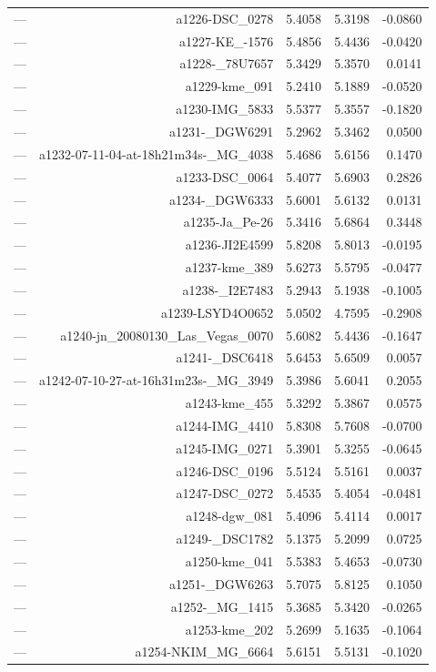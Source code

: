 \begin{table}[htbp]
\begin{tabular}{lrrrr}
— & a1226-DSC_0278 & 5.4058 & 5.3198 & -0.0860 \\
— & a1227-KE_-1576 & 5.4856 & 5.4436 & -0.0420 \\
— & a1228-_78U7657 & 5.3429 & 5.3570 & 0.0141 \\
— & a1229-kme_091 & 5.2410 & 5.1889 & -0.0520 \\
— & a1230-IMG_5833 & 5.5377 & 5.3557 & -0.1820 \\
— & a1231-_DGW6291 & 5.2962 & 5.3462 & 0.0500 \\
— & a1232-07-11-04-at-18h21m34s-_MG_4038 & 5.4686 & 5.6156 & 0.1470 \\
— & a1233-DSC_0064 & 5.4077 & 5.6903 & 0.2826 \\
— & a1234-_DGW6333 & 5.6001 & 5.6132 & 0.0131 \\
— & a1235-Ja_Pe-26 & 5.3416 & 5.6864 & 0.3448 \\
— & a1236-JI2E4599 & 5.8208 & 5.8013 & -0.0195 \\
— & a1237-kme_389 & 5.6273 & 5.5795 & -0.0477 \\
— & a1238-_I2E7483 & 5.2943 & 5.1938 & -0.1005 \\
— & a1239-LSYD4O0652 & 5.0502 & 4.7595 & -0.2908 \\
— & a1240-jn_20080130_Las_Vegas_0070 & 5.6082 & 5.4436 & -0.1647 \\
— & a1241-_DSC6418 & 5.6453 & 5.6509 & 0.0057 \\
— & a1242-07-10-27-at-16h31m23s-_MG_3949 & 5.3986 & 5.6041 & 0.2055 \\
— & a1243-kme_455 & 5.3292 & 5.3867 & 0.0575 \\
— & a1244-IMG_4410 & 5.8308 & 5.7608 & -0.0700 \\
— & a1245-IMG_0271 & 5.3901 & 5.3255 & -0.0645 \\
— & a1246-DSC_0196 & 5.5124 & 5.5161 & 0.0037 \\
— & a1247-DSC_0272 & 5.4535 & 5.4054 & -0.0481 \\
— & a1248-dgw_081 & 5.4096 & 5.4114 & 0.0017 \\
— & a1249-_DSC1782 & 5.1375 & 5.2099 & 0.0725 \\
— & a1250-kme_041 & 5.5383 & 5.4653 & -0.0730 \\
— & a1251-_DGW6263 & 5.7075 & 5.8125 & 0.1050 \\
— & a1252-_MG_1415 & 5.3685 & 5.3420 & -0.0265 \\
— & a1253-kme_202 & 5.2699 & 5.1635 & -0.1064 \\
— & a1254-NKIM_MG_6664 & 5.6151 & 5.5131 & -0.1020 \\

\end{tabular}
\end{table}
